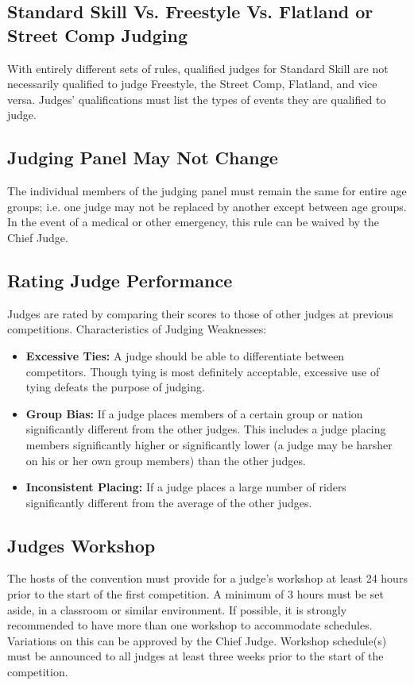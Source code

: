\subsection{Standard Skill Vs. Freestyle Vs. Flatland or Street Comp Judging}
With entirely different sets of rules, qualified judges for Standard Skill are not necessarily qualified to judge Freestyle, the Street Comp, Flatland, and vice versa.
Judges' qualifications must list the types of events they are qualified to judge.

\subsection{Judging Panel May Not Change}
The individual members of the judging panel must remain the same for entire age groups; i.e. one judge may not be replaced by another except between age groups.
In the event of a medical or other emergency, this rule can be waived by the Chief Judge.

\subsection{Rating Judge Performance}
Judges are rated by comparing their scores to those of other judges at previous competitions.
Characteristics of Judging Weaknesses:
\begin{itemize}
\item \textbf{Excessive Ties:}
A judge should be able to differentiate between competitors.
Though tying is most definitely acceptable, excessive use of tying defeats the purpose of judging.
\item \textbf{Group Bias:}
If a judge places members of a certain group or nation significantly different from the other judges.
This includes a judge placing members significantly higher or significantly lower (a judge may be harsher on his or her own group members) than the other judges.
\item\textbf{Inconsistent Placing:}
If a judge places a large number of riders significantly different from the average of the other judges.
\end{itemize}

\subsection{Judges Workshop}
The hosts of the convention must provide for a judge's workshop at least 24 hours prior to the start of the first competition.
A minimum of 3 hours must be set aside, in a classroom or similar environment.
If possible, it is strongly recommended to have more than one workshop to accommodate schedules.
Variations on this can be approved by the Chief Judge.
Workshop schedule(s) must be announced to all judges at least three weeks prior to the start of the competition.

